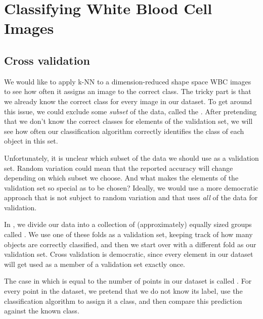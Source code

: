 \FloatBarrier
{}

\section{Classifying White Blood Cell Images}
\label{sec:training}

\subsection{Cross validation}

We would like to apply k-NN to a dimension-reduced shape space WBC images to see how often it assigns an image to the correct class. The tricky part is that we already know the correct class for every image in our dataset. To get around this issue, we could exclude some \textit{subset} of the data, called the . After pretending that we don't know the correct classes for elements of the validation set, we will see how often our classification algorithm correctly identifies the class of each object in this set.\\

\begin{qbox}\end{qbox}

Unfortunately, it is unclear which subset of the data we should use as a validation set. Random variation could mean that the reported accuracy will change depending on which subset we choose. And what makes the elements of the validation set so special as to be chosen? Ideally, we would use a more democratic approach that is not subject to random variation and that uses \textit{all} of the data for validation.

In , we divide our data into a collection of  (approximately) equally sized groups called . We use one of these folds as a validation set, keeping track of how many objects are correctly classified, and then we start over with a different fold as our validation set. Cross validation is democratic, since every element in our dataset will get used as a member of a validation set exactly once.

The case in which  is equal to the number of points in our dataset is called . For every point in the dataset, we pretend that we do not know its label, use the classification algorithm to assign it a class, and then compare this prediction against the known class.

